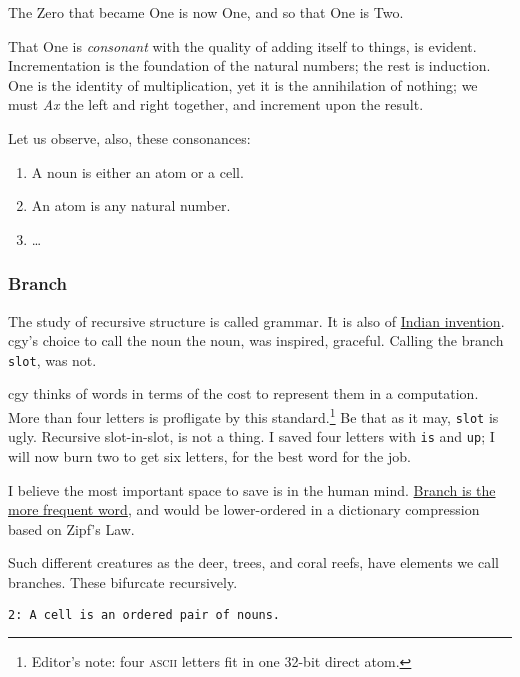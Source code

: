 \documentclass[twoside]{article}
\begin{document}
The Zero that became One is now One, and so that One is Two.

That One is \emph{consonant} with the quality of adding itself to things, is evident. Incrementation is the foundation of the natural numbers; the rest is induction. One is the identity of multiplication, yet it is the annihilation of nothing; we must \emph{Ax} the left and right together, and increment upon the result.

Let us observe, also, these consonances:

\begin{enumerate}
  \setcounter{enumi}{0}
  \item A noun is either an atom or a cell.
  \item An atom is any natural number.
  \item \ldots{}
\end{enumerate}

\subsubsection{Branch}

The study of recursive structure is called grammar. It is also of \href{https://en.wikipedia.org/wiki/P%C4%81%E1%B9%87ini}{Indian invention}. cgy's choice to call the noun the noun, was inspired, graceful. Calling the branch \texttt{slot}, was not.

cgy thinks of words in terms of the cost to represent them in a computation. More than four letters is profligate by this standard.\footnote{Editor's note:  four \textsc{ascii} letters fit in one 32-bit direct atom.} Be that as it may, \texttt{slot} is ugly. Recursive slot-in-slot, is not a thing. I saved four letters with \texttt{is} and \texttt{up}; I will now burn two to get six letters, for the best word for the job.

I believe the most important space to save is in the human mind. \href{https://books.google.com/ngrams/graph?content=branch%2Cslot&year_start=1800&year_end=2000&corpus=15&smoothing=3}{Branch is the more frequent word}, and would be lower-ordered in a dictionary compression based on Zipf's Law.

Such different creatures as the deer, trees, and coral reefs, have elements we call branches. These bifurcate recursively.

\begin{lstlisting}[style=listingblock]
2: A cell is an ordered pair of nouns.
\end{lstlisting}
\end{document}
